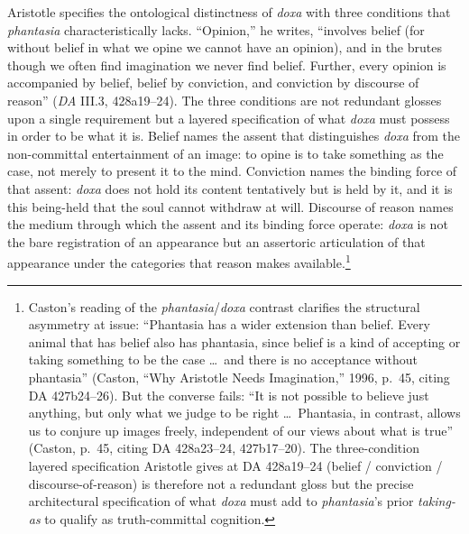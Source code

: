 \documentclass{article}
\begin{document}
Aristotle specifies the ontological distinctness of \textit{doxa} with three conditions that \textit{phantasia} characteristically lacks. ``Opinion,'' he writes, ``involves belief (for without belief in what we opine we cannot have an opinion), and in the brutes though we often find imagination we never find belief. Further, every opinion is accompanied by belief, belief by conviction, and conviction by discourse of reason'' (\textit{DA} III.3, 428a19--24). The three conditions are not redundant glosses upon a single requirement but a layered specification of what \textit{doxa} must possess in order to be what it is. Belief names the assent that distinguishes \textit{doxa} from the non-committal entertainment of an image: to opine is to take something as the case, not merely to present it to the mind. Conviction names the binding force of that assent: \textit{doxa} does not hold its content tentatively but is held by it, and it is this being-held that the soul cannot withdraw at will. Discourse of reason names the medium through which the assent and its binding force operate: \textit{doxa} is not the bare registration of an appearance but an assertoric articulation of that appearance under the categories that reason makes available.\footnote{Caston's reading of the \textit{phantasia}/\textit{doxa} contrast clarifies the structural asymmetry at issue: ``Phantasia has a wider extension than belief. Every animal that has belief also has phantasia, since belief is a kind of accepting or taking something to be the case \ldots\ and there is no acceptance without phantasia'' (Caston, ``Why Aristotle Needs Imagination,'' 1996, p.~45, citing DA 427b24--26). But the converse fails: ``It is not possible to believe just anything, but only what we judge to be right \ldots\ Phantasia, in contrast, allows us to conjure up images freely, independent of our views about what is true'' (Caston, p.~45, citing DA 428a23--24, 427b17--20). The three-condition layered specification Aristotle gives at DA 428a19--24 (belief / conviction / discourse-of-reason) is therefore not a redundant gloss but the precise architectural specification of what \textit{doxa} must add to \textit{phantasia}'s prior \textit{taking-as} to qualify as truth-committal cognition.}
\end{document}
